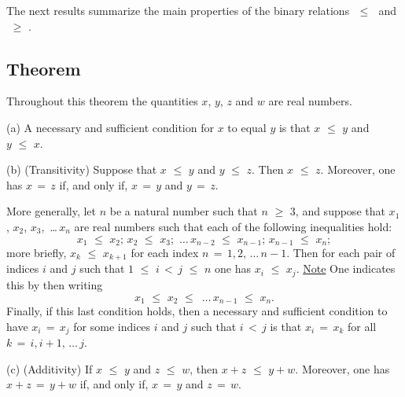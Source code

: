{\V

        The next results summarize the main properties of the binary relations $\,\,{\leq}\,\,$ and $\,\,{\geq}\,\,$.

\V

            \subsection{\small{\bf Theorem}}
            \label{ThmB20.60}

\V

        Throughout this theorem the quantities $x$, $y$, $z$ and $w$ are real numbers.

\V

        (a) A necessary and sufficient condition for $x$ to equal $y$ is that $x\,\,{\leq}\,\,y$ and $y\,\,{\leq}\,\,x$.

\V

        (b) (Transitivity) Suppose that $x\,\,{\leq}\,\,y$ and $y\,\,{\leq}\,\,z$.
    Then $x\,\,{\leq}\,\,z$.
    Moreover, one has $x \,=\, z$ if, and only if, $x \,=\, y$ and $y \,=\, z$.

        More generally, let $n$ be a natural number such that $n\,\,{\geq}\,\,3$,
    and suppose that $x_{1}$, $x_{2}$, $x_{3}$, \,{\ldots}\,$x_{n}$ are real numbers such that each of the following inequalities hold:
        \begin{displaymath}
        x_{1}\,\,{\leq}\,\,x_{2}; \,x_{2}\,\,{\leq}\,\,x_{3};
    \,\,{\ldots}\,
        x_{n-2}\,\,{\leq}\,\,x_{n-1};\, x_{n-1}\,\,{\leq}\,\,x_{n};
        \end{displaymath}
    more briefly, $x_{k}\,\,{\leq}\,\,x_{k+1}$ for each index $n \,=\, 1,2,\,{\ldots}\,n-1$.
    Then for each pair of indices $i$ and $j$ such that $1\,\,{\leq}\,\,i\,<\,j\,\,{\leq}\,\,n$ one has $x_{i}\,\,{\leq}\,\,x_{j}$.
    \underline{Note} One indicates this by then writing
        \begin{displaymath}
        x_{1}\,\,{\leq}\,\,x_{2}\,\,{\leq}\,\,\,{\ldots}\,x_{n-1}\,\,{\leq}\,\,x_{n}.
        \end{displaymath}
    Finally, if this last condition holds, then a necessary and sufficient condition to have $x_{i} \,=\, x_{j}$
    for some indices $i$ and $j$ such that $i\,<\,j$ is that $x_{i} \,=\, x_{k}$ for all $k \,=\, i, i+1, \,{\ldots}\,j$.

\V

        (c) (Additivity) If $x\,\,{\leq}\,\,y$ and $z\,\,{\leq}\,\,w$, then $x+z\,\,{\leq}\,\,y+w$.
    Moreover, one has $x+z \,=\, y+w$ if, and only if, $x \,=\, y$ and $z \,=\, w$.


}
